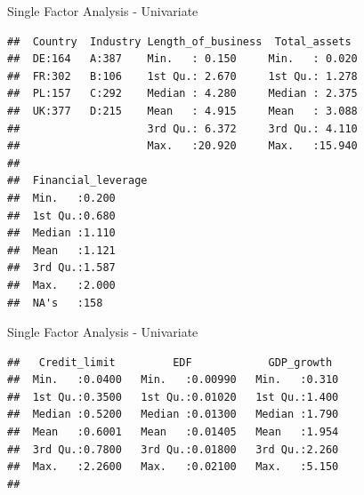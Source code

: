 \documentclass[9pt,ignorenonframetext,]{beamer}
\begin{document}
\begin{frame}[fragile]{Single Factor Analysis - Univariate}

\begin{verbatim}
##  Country  Industry Length_of_business  Total_assets   
##  DE:164   A:387    Min.   : 0.150     Min.   : 0.020  
##  FR:302   B:106    1st Qu.: 2.670     1st Qu.: 1.278  
##  PL:157   C:292    Median : 4.280     Median : 2.375  
##  UK:377   D:215    Mean   : 4.915     Mean   : 3.088  
##                    3rd Qu.: 6.372     3rd Qu.: 4.110  
##                    Max.   :20.920     Max.   :15.940  
##                                                       
##  Financial_leverage
##  Min.   :0.200     
##  1st Qu.:0.680     
##  Median :1.110     
##  Mean   :1.121     
##  3rd Qu.:1.587     
##  Max.   :2.000     
##  NA's   :158
\end{verbatim}

\end{frame}

\begin{frame}[fragile]{Single Factor Analysis - Univariate}

\begin{verbatim}
##   Credit_limit         EDF            GDP_growth   
##  Min.   :0.0400   Min.   :0.00990   Min.   :0.310  
##  1st Qu.:0.3500   1st Qu.:0.01020   1st Qu.:1.400  
##  Median :0.5200   Median :0.01300   Median :1.790  
##  Mean   :0.6001   Mean   :0.01405   Mean   :1.954  
##  3rd Qu.:0.7800   3rd Qu.:0.01800   3rd Qu.:2.260  
##  Max.   :2.2600   Max.   :0.02100   Max.   :5.150  
## 
\end{verbatim}

\end{frame}
\end{document}
